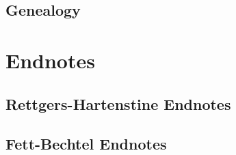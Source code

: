 \documentclass[11pt,letter]{book}
\begin{document}
\section{Genealogy}



\chapter{Endnotes}


\section{Rettgers-Hartenstine Endnotes}

\footnotesize



\normalsize

\section{Fett-Bechtel Endnotes}

\footnotesize



\normalsize
\end{document}
